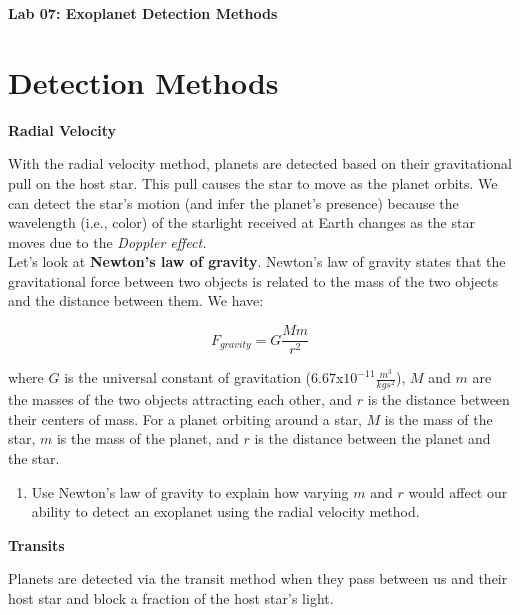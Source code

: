 \documentclass[11pt]{article}%
\newcommand{\labnumber}{07}  %
\begin{document}
\begin{center}
\Large\textbf{Lab \labnumber: Exoplanet Detection Methods}
\end{center}


\section{Detection Methods}

\noindent \textbf{Radial Velocity} 

\vspace{0.1in}

\noindent With the radial velocity method, planets are detected based on their gravitational pull on the host star. This pull causes the star to move as the planet orbits. We can detect the star's motion (and infer the planet's presence) because the wavelength (i.e., color) of the starlight received at Earth changes as the star moves due to the \textit{Doppler effect.}  \\

\noindent Let's look at \textbf{Newton's law of gravity}.  Newton's law of gravity states that the gravitational force between two objects is related to the mass of the two objects and the distance between them.  We have:

\begin{equation}
F_{gravity}  = G \frac{M m}{r^2}
\end{equation}

\noindent where $G$ is the universal constant of gravitation ($6.67$x$10^{-11} \frac{m^3}{kg s^2}$), $M$ and $m$ are the masses of the two objects attracting each other, and $r$ is the distance between their centers of mass. For a planet orbiting around a star, $M$ is the mass of the star, $m$ is the mass of the planet, and $r$ is the distance between the planet and the star. 

\begin{enumerate}
\item Use Newton's law of gravity to explain how varying $m$ and $r$ would affect our ability to detect an exoplanet using the radial velocity method.
\end{enumerate}

\noindent \textbf{Transits}

\vspace{0.1in}

\noindent Planets are detected via the transit method when they pass between us and their host star and block a fraction of the host star's light.  
\end{document}

